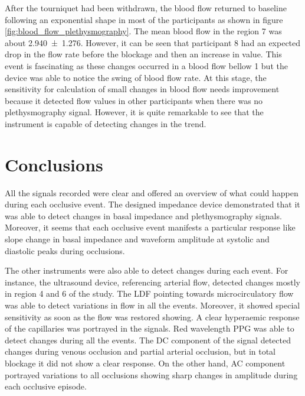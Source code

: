 After the tourniquet had been withdrawn, the blood flow returned to baseline following an exponential shape  in most of the participants as shown in figure \ref{fig:blood_flow_plethysmography}. The mean blood flow in the region 7 was about \SI{2.940(1276)}{\bfv}. However, it can be seen that participant 8 had an expected drop in the flow rate before the blockage and then an increase in value. This event is fascinating as these changes occurred in a blood flow bellow \SI{1}{\bfv} but the device was able to notice the swing of blood flow rate. At this stage, the sensitivity for calculation of small changes in blood flow needs improvement because it detected flow values in other participants when there was no plethysmography signal. However, it is quite remarkable to see that the instrument is capable of detecting changes in the trend.

\section{Conclusions}
\label{section apa 10}
All the signals recorded were clear and offered an overview of what could happen during each occlusive event. The designed impedance device demonstrated that it was able to detect changes in basal impedance and plethysmography signals. Moreover, it seems that each occlusive event manifests a particular response like slope change in basal impedance and waveform amplitude at systolic and diastolic peaks during occlusions. 

The other instruments were also able to detect changes during each event. For instance, the ultrasound device, referencing arterial flow, detected changes mostly in region 4 and 6 of the study. The LDF pointing towards microcirculatory flow was able to detect variations in flow in all the events. Moreover, it showed special sensitivity as soon as the flow was restored showing.  A clear hyperaemic response of the capillaries was portrayed in the signals. Red wavelength PPG was able to detect changes during all the events. The DC component of the signal detected changes during venous occlusion and partial arterial occlusion, but in total blockage it did not show a clear response. On the other hand, AC component portrayed variations to all occlusions showing sharp changes in amplitude during each occlusive episode. 

